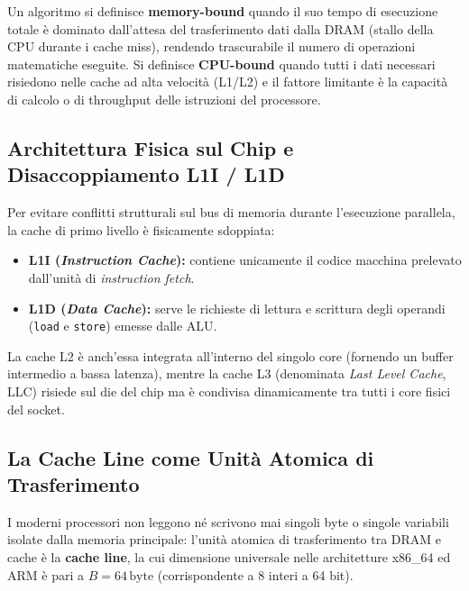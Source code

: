 \begin{definition}
Un algoritmo si definisce \textbf{memory-bound} quando il suo tempo di esecuzione totale \`e dominato dall'attesa del trasferimento dati dalla DRAM (stallo della CPU durante i cache miss), rendendo trascurabile il numero di operazioni matematiche eseguite. Si definisce \textbf{CPU-bound} quando tutti i dati necessari risiedono nelle cache ad alta velocit\`a (L1/L2) e il fattore limitante \`e la capacit\`a di calcolo o di throughput delle istruzioni del processore.
\end{definition}

\FloatBarrier
\subsection{Architettura Fisica sul Chip e Disaccoppiamento L1I / L1D}
\label{subsec:architettura-chip-l1}

Per evitare conflitti strutturali sul bus di memoria durante l'esecuzione parallela, la cache di primo livello \`e fisicamente sdoppiata:
\begin{itemize}
    \item \textbf{L1I (\textit{Instruction Cache}):} contiene unicamente il codice macchina prelevato dall'unit\`a di \textit{instruction fetch}.
    \item \textbf{L1D (\textit{Data Cache}):} serve le richieste di lettura e scrittura degli operandi (\texttt{load} e \texttt{store}) emesse dalle ALU.
\end{itemize}
La cache L2 \`e anch'essa integrata all'interno del singolo core (fornendo un buffer intermedio a bassa latenza), mentre la cache L3 (denominata \textit{Last Level Cache}, LLC) risiede sul die del chip ma \`e condivisa dinamicamente tra tutti i core fisici del socket.

\FloatBarrier
\subsection{La Cache Line come Unit\`a Atomica di Trasferimento}
\label{subsec:cache-line}

\begin{property}[Unit\`a di Trasferimento Hardware: $B = 64\text{ Byte}$]
I moderni processori non leggono né scrivono mai singoli byte o singole variabili isolate dalla memoria principale: l'unit\`a atomica di trasferimento tra DRAM e cache \`e la \textbf{cache line}, la cui dimensione universale nelle architetture x86\_64 ed ARM \`e pari a $B = 64\,\text{byte}$ (corrispondente a 8 interi a 64 bit).
\end{property}

